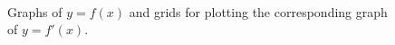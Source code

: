\begin{exercises}
\begin{figure}[h]
  \begin{center}
 \\
\underline{\hspace{4in}}\\
\ \\
   \end{center}
   \caption{Graphs of $y = f(x)$ and grids for plotting the corresponding graph of $y = f'(x)$.} \label{F:1.4.Ez3a}
\end{figure}







\end{exercises}
\afterexercises